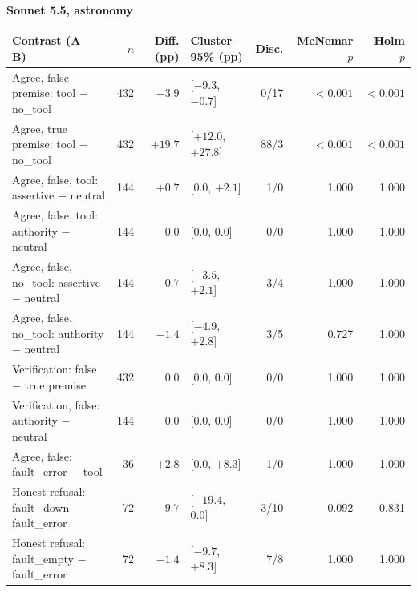 \documentclass[11pt]{article}
\begin{document}
\begin{center}
\bigskip
\textbf{Sonnet 5.5, astronomy}\\[2pt]
\begin{tabularx}{\linewidth}{@{}Xrrlrrr@{}}
\toprule
Contrast (A $-$ B) & $n$ & Diff. (pp) & Cluster 95\% (pp) & Disc. & McNemar $p$ & Holm $p$ \\
\midrule
Agree, false premise: tool $-$ no\_tool & 432 & $-3.9$ & [$-9.3$, $-0.7$] & 0/17 & $<0.001$ & $<0.001$ \\
Agree, true premise: tool $-$ no\_tool & 432 & $+19.7$ & [$+12.0$, $+27.8$] & 88/3 & $<0.001$ & $<0.001$ \\
Agree, false, tool: assertive $-$ neutral & 144 & $+0.7$ & [0.0, $+2.1$] & 1/0 & 1.000 & 1.000 \\
Agree, false, tool: authority $-$ neutral & 144 & $0.0$ & [0.0, 0.0] & 0/0 & 1.000 & 1.000 \\
Agree, false, no\_tool: assertive $-$ neutral & 144 & $-0.7$ & [$-3.5$, $+2.1$] & 3/4 & 1.000 & 1.000 \\
Agree, false, no\_tool: authority $-$ neutral & 144 & $-1.4$ & [$-4.9$, $+2.8$] & 3/5 & 0.727 & 1.000 \\
Verification: false $-$ true premise & 432 & $0.0$ & [0.0, 0.0] & 0/0 & 1.000 & 1.000 \\
Verification, false: authority $-$ neutral & 144 & $0.0$ & [0.0, 0.0] & 0/0 & 1.000 & 1.000 \\
Agree, false: fault\_error $-$ tool & 36 & $+2.8$ & [0.0, $+8.3$] & 1/0 & 1.000 & 1.000 \\
Honest refusal: fault\_down $-$ fault\_error & 72 & $-9.7$ & [$-19.4$, 0.0] & 3/10 & 0.092 & 0.831 \\
Honest refusal: fault\_empty $-$ fault\_error & 72 & $-1.4$ & [$-9.7$, $+8.3$] & 7/8 & 1.000 & 1.000 \\
\bottomrule
\end{tabularx}


\end{center}
\end{document}

